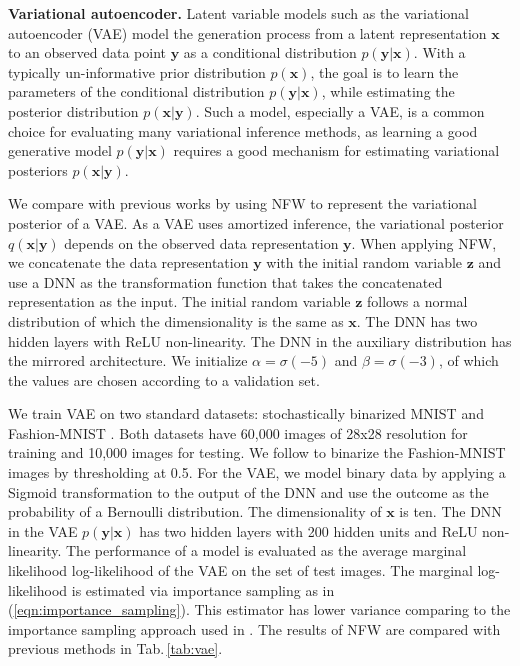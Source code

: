 \documentclass{article}
\newcommand{\yV}{\mathbf{y}}
\newcommand{\xV}{\mathbf{x}}
\newcommand{\zV}{\mathbf{z}}
\newcommand{\acr}[1]{\textsc{#1}\xspace}
\newcommand{\us}{\acr{NFW}}
\begin{document}

\textbf{Variational autoencoder.} Latent variable models such as the variational autoencoder (VAE) \citep{KingmaWelling2014} model the generation process from a latent representation $\xV$ to an observed data point $\yV$ as a conditional distribution $p(\yV|\xV)$. With a typically un-informative prior distribution $p(\xV)$, the goal is to learn the parameters of the conditional distribution $p(\yV|\xV)$, while estimating the posterior distribution $p(\xV|\yV)$. Such a model, especially a VAE, is a common choice for evaluating many variational inference methods, as learning a good generative model $p(\yV|\xV)$ requires a good mechanism for estimating variational posteriors $p(\xV|\yV)$. 

We compare with previous works by using \us to represent the variational posterior of a VAE. As a VAE uses amortized inference, the variational posterior $q(\xV|\yV)$ depends on the observed data representation $\yV$. When applying \us, we concatenate the data representation $\yV$ with the initial random variable $\zV$ and use a DNN as the transformation function that takes the concatenated representation as the input. The initial random variable $\zV$ follows a normal distribution of which the dimensionality is the same as $\xV$. The DNN has two hidden layers with ReLU non-linearity. The DNN in the auxiliary distribution has the mirrored architecture. We initialize $\alpha=\sigma(-5)$ and $\beta=\sigma(-3)$, of which the values are chosen according to a validation set.

We train VAE on two standard datasets: stochastically binarized MNIST \citep{SalakhutdinovMurray2008} and Fashion-MNIST \citep{XiaoEtAl2017}. Both datasets have 60,000 images of 28x28 resolution for training and 10,000 images for testing. We follow \citep{TitsiasRuiz2019} to binarize the Fashion-MNIST images by thresholding at 0.5. For the VAE, we model binary data by applying a Sigmoid transformation to the output of the DNN and use the outcome as the probability of a Bernoulli distribution. The dimensionality of $\xV$ is ten. The DNN in the VAE $p(\yV|\xV)$ has two hidden layers with 200 hidden units and ReLU non-linearity. The performance of a model is evaluated as the average marginal likelihood log-likelihood of the VAE on the set of test images. The marginal log-likelihood is estimated via importance sampling as in (\ref{eqn:importance_sampling}). This estimator has lower variance comparing to the importance sampling approach used in \citep{YinZhou2018, TitsiasRuiz2019}.
%
The results of \us are compared with previous methods in Tab.\,\ref{tab:vae}.
\end{document}
